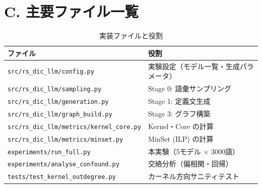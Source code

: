 \documentclass[lang=jp, color=black, mode=simple, 11pt]{elegantbook}
\begin{document}
\section*{C. 主要ファイル一覧}

\begin{table}[htbp]
\centering
\caption{実装ファイルと役割}
\begin{tabular}{ll}
\toprule
ファイル & 役割 \\
\midrule
\texttt{src/rs\_dic\_llm/config.py} & 実験設定（モデル一覧・生成パラメータ） \\
\texttt{src/rs\_dic\_llm/sampling.py} & Stage 0: 語彙サンプリング \\
\texttt{src/rs\_dic\_llm/generation.py} & Stage 1: 定義文生成 \\
\texttt{src/rs\_dic\_llm/graph\_build.py} & Stage 3: グラフ構築 \\
\texttt{src/rs\_dic\_llm/metrics/kernel\_core.py} & Kernel・Core の計算 \\
\texttt{src/rs\_dic\_llm/metrics/minset.py} & MinSet (ILP) の計算 \\
\texttt{experiments/run\_full.py} & 本実験（5モデル × 3000語） \\
\texttt{experiments/analyse\_confound.py} & 交絡分析（偏相関・回帰） \\
\texttt{tests/test\_kernel\_outdegree.py} & カーネル方向サニティテスト \\
\bottomrule
\end{tabular}
\end{table}
\end{document}

